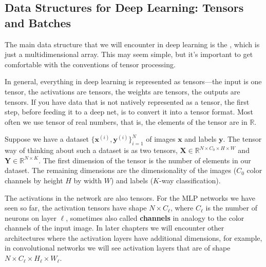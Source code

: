 



\subsection{Data Structures for Deep Learning: Tensors and Batches}

The main data structure that we will encounter in deep learning is the , which is just a multidimensional array. This may seem simple, but it's important to get comfortable with the conventions of tensor processing.

In general, everything in deep learning is represented as tensors—the input is one tensor, the activations are tensors, the weights are tensors, the outputs are tensors. If you have data that is not natively represented as a tensor, the first step, before feeding it to a deep net, is to convert it into a tensor format. Most often we use tensor of real numbers, that is, the elements of the tensor are in $\mathbb{R}$.

Suppose we have a dataset $\{\mathbf{x}^{(i)}, \mathbf{y}^{(i)}\}_{i=1}^N$ of images $\mathbf{x}$ and labels $\mathbf{y}$. The tensor way of thinking about such a dataset is as two tensors, $\mathbf{X} \in \mathbb{R}^{N \times C_0 \times H \times W }$ and $\mathbf{Y} \in \mathbb{R}^{N \times K}$. The first dimension of the tensor is the number of elements in our dataset. The remaining dimensions are the dimensionality of the images ($C_0$ color channels by height $H$ by width $W$) and labels ($K$-way classification).

The activations in the network are also tensors. For the MLP networks we have seen so far, the activation tensors have shape $N \times C_{\ell}$, where $C_{\ell}$ is the number of neurons on layer $\ell$, sometimes also called \textbf{channels} in analogy to the color channels of the input image. In later chapters we will encounter other architectures where the activation layers have additional dimensions, for example, in convolutional networks we will see activation layers that are of shape $N \times C_{\ell} \times H_{\ell} \times W_{\ell}$.

